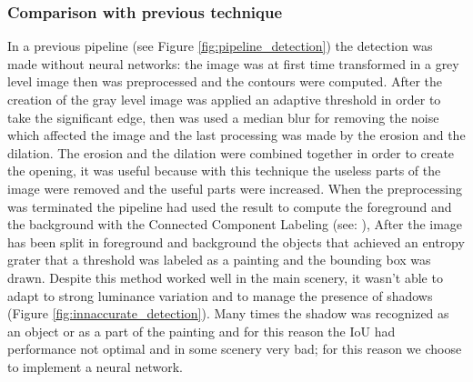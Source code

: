 \subsubsection{Comparison with previous technique}
In a previous pipeline (see Figure \ref{fig:pipeline_detection}) the detection was made without neural networks: the image was at first time transformed in a grey level image then was preprocessed and the contours were computed. After the creation of the gray level image was applied an adaptive threshold in order to take the significant edge, then was used a median blur for removing the noise which affected the image and the last processing was made by the erosion and the dilation.
The erosion and the dilation were combined together in order to create the opening, it was useful because with this technique the useless parts of the image were removed and the useful parts were increased.
When the preprocessing was terminated the pipeline had used the result to compute the foreground and the background with the Connected Component Labeling (see: \cite{Grana_ccl}),
After the image has been split in foreground and background the objects that achieved an entropy grater that a threshold was labeled as a painting and the bounding box was drawn.
Despite this method worked well in the main scenery, it wasn't able to adapt to strong luminance variation and to manage the presence of shadows (Figure \ref{fig:innaccurate_detection}). Many times the shadow was recognized as an object or as a part of the painting and for this reason the IoU had performance not optimal and in some scenery very bad; for this reason we choose to implement a neural network.

